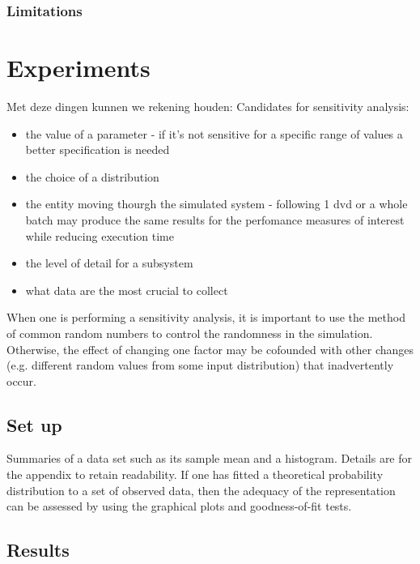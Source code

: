 \documentclass[11pt,a4paper]{article}
\begin{document}
\subsubsection{Limitations}

\section{Experiments}
Met deze dingen kunnen we rekening houden:
Candidates for sensitivity analysis:
\begin{itemize}
\item the value of a parameter - if it's not sensitive for a specific range of values a better specification is needed
\item  the choice of a distribution
\item  the entity moving thourgh the simulated system - following 1 dvd or a whole batch may produce the same results for the perfomance measures of interest while reducing execution time
\item the level of detail for a subsystem
\item  what data are the most crucial to collect 
\end{itemize}
When one is performing a sensitivity analysis, it is important to use the method of common random numbers to control the randomness in the simulation. Otherwise, the effect of changing one factor may be cofounded with other changes (e.g. different random values from some input distribution) that inadvertently occur.

\subsection{Set up}
Summaries of a data set such as its sample mean and a histogram. Details are for the appendix to retain readability. 
If one has fitted a theoretical probability distribution to a set of observed data, then the adequacy of the representation can be assessed by using the graphical plots and goodness-of-fit tests. 
\subsection{Results}
\end{document}
